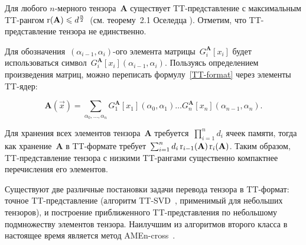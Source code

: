 Для любого $n$-мерного тензора~$\mathbf{A}$ существует TT\hyp{}представление с максимальным TT\hyp{}рангом $\operatorname{r}(\mathbf{A}) \leqslant d^{\frac{n}{2}}$~(см. теорему~2.1 Оселедца \cite{oseledets2011ttMain}). Отметим, что TT\hyp{}представление тензора не единственно.


Для обозначения~$(\alpha_{i-1}, \alpha_{i})$-ого элемента матрицы~$G_i^{\mathbf{A}}[x_i]$ будет использоваться символ~$G_i^{\mathbf{A}}[x_i](\alpha_{i-1}, \alpha_{i})$.
Пользуясь определением произведения матриц, можно переписать формулу~\eqref{TT-format} через элементы TT\hyp{}ядер:

\begin{equation}
	\label{TT-format-sum}
	\mathbf{A}(\vec{x}) =
	\sum_{\alpha_0, \ldots, \alpha_n} G^{\mathbf{A}}_1[x_1](\alpha_0, \alpha_1) \ldots G^{\mathbf{A}}_n[x_n](\alpha_{n-1}, \alpha_n).
\end{equation}

Для хранения всех элементов тензора~$\mathbf{A}$ требуется~$\prod_{i=1}^n d_i$ ячеек памяти, тогда как хранение~$\mathbf{A}$ в TT\hyp{}формате требует~$\sum_{i=1}^n d_i \operatorname{r}_{i-1}(\mathbf{A}) \operatorname{r}_{i}(\mathbf{A})$. Таким образом, TT\hyp{}представление тензора с низкими TT\hyp{}рангами существенно компактнее перечисления его элементов.

Существуют две различные постановки задачи перевода тензора в TT\hyp{}формат: точное TT\hyp{}представление (алгоритм TT-SVD~\cite{oseledets2011ttMain}, применимый для небольших тензоров), и построение приближенного TT\hyp{}представления по небольшому подмножеству элементов тензора. Наилучшим из алгоритмов второго класса в настоящее время является метод AMEn-cross~\cite{dolgov2013amenCross}.

